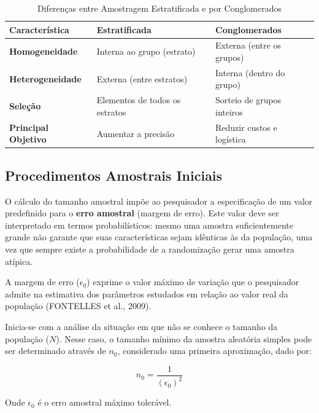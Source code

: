 \begin{table}[h]
\centering
\small
\caption{Diferenças entre Amostragem Estratificada e por Conglomerados}
\begin{tabular}{|l|p{4.5cm}|p{4.5cm}|}
\hline
\rowcolor[gray]{0.9} \textbf{Característica} & \textbf{Estratificada} & \textbf{Conglomerados} \\ \hline
\textbf{Homogeneidade} & Interna ao grupo (estrato) & Externa (entre os grupos) \\ \hline
\textbf{Heterogeneidade} & Externa (entre estratos) & Interna (dentro do grupo) \\ \hline
\textbf{Seleção} & Elementos de todos os estratos & Sorteio de grupos inteiros \\ \hline
\textbf{Principal Objetivo} & Aumentar a precisão & Reduzir custos e logística \\ \hline
\end{tabular}
\end{table}

\newpage
\subsection{Procedimentos Amostrais Iniciais}

O cálculo do tamanho amostral impõe ao pesquisador a especificação de um valor predefinido para o \textbf{erro amostral} (margem de erro). Este valor deve ser interpretado em termos probabilísticos: mesmo uma amostra suficientemente grande não garante que suas características sejam idênticas às da população, uma vez que sempre existe a probabilidade de a randomização gerar uma amostra atípica. \vskip0.3cm

A margem de erro ($\epsilon_0$) exprime o valor máximo de variação que o pes\-qui\-sa\-dor admite na estimativa dos parâmetros estudados em relação ao valor real da população (FONTELLES et al., 2009). \vskip0.3cm

Inicia-se com a análise da situação em que não se conhece o tamanho da população ($N$). Nesse caso, o tamanho mínimo da amostra aleatória simples pode ser determinado através de $n_{0}$, considerado uma primeira aproximação, dado por:

\begin{equation}\label{eq:nzero_infinito}
    n_{0}= \frac{1}{(\epsilon_{0})^2}
\end{equation}

Onde $\epsilon_{0}$ é o erro amostral máximo tolerável.
\vskip0.3cm

